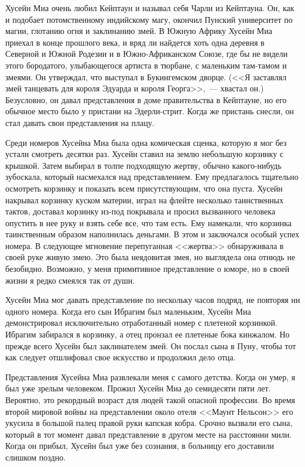 \documentclass[12pt,a4paper,twoside,openany,svgnames]{memoir}
\begin{document}
Хусейн Миа очень любил Кейптаун и называл себя Чарли из Кейптауна. Он, как и подобает потомственному индийскому магу, окончил Пунский университет по магии, глотанию огня и заклинанию змей. В Южную Африку Хусейн Миа приехал в конце прошлого века, и вряд ли найдется хоть одна деревня в Северной и Южной Родезии и в Южно-Африканском Союзе, где бы не видели этого бородатого, улыбающегося артиста в тюрбане, с маленьким там-тамом и змеями. Он утверждал, что выступал в Букингемском дворце. (<<Я заставлял змей танцевать для короля Эдуарда и короля Георга>>,~--- хвастал он.) Безусловно, он давал представления в доме правительства в Кейптауне, но его обычное место было у пристани на Эдерли-стрит. Когда же пристань снесли, он стал давать свои представления на плацу.

Среди номеров Хусейна Миа была одна комическая сценка, которую я мог без устали смотреть десятки раз. Хусейн ставил на землю небольшую корзинку с крышкой. Затем выбирал в толпе подходящую жертву, обычно какого-нибудь зубоскала, который насмехался над представлением. Ему предлагалось тщательно осмотреть корзинку и показать всем присутствующим, что она пуста. Хусейн накрывал корзинку куском материи, играл на флейте несколько таинственных тактов, доставал корзинку из-под покрывала и просил вызванного человека опустить в нее руку и взять себе все, что там есть. Ему намекали, что корзинка таинственным образом наполнилась деньгами. В этом и заключался особый успех номера. В следующее мгновение перепуганная <<жертва>> обнаруживала в своей руке живую змею. Это была неядовитая змея, но выглядела она отнюдь не безобидно. Возможно, у меня примитивное представление о юморе, но в своей жизни я редко смеялся так от души.

Хусейн Миа мог давать представление по нескольку часов подряд, не повторяя ни одного номера. Когда его сын Ибрагим был маленьким, Хусейн Миа демонстрировал исключительно отработанный номер с плетеной корзинкой. Ибрагим забирался в корзинку, а отец пронзал ее плетеные бока кинжалом. Но прежде всего Хусейн был заклинателем змей. Он послал сына в Пуну, чтобы тот как следует отшлифовал свое искусство и продолжил дело отца.

Представления Хусейна Миа развлекали меня с самого детства. Когда он умер, я был уже зрелым человеком. Прожил Хусейн Миа до семидесяти пяти лет. Вероятно, это рекордный возраст для людей такой опасной профессии. Во время второй мировой войны на представлении около отеля <<Маунт Нельсон>> его укусила в большой палец правой руки капская кобра. Срочно вызвали его сына, который в тот момент давал представление в другом месте на расстоянии мили. Когда он прибыл, Хусейн был уже без сознания, в больницу его доставили слишком поздно.
\end{document}
